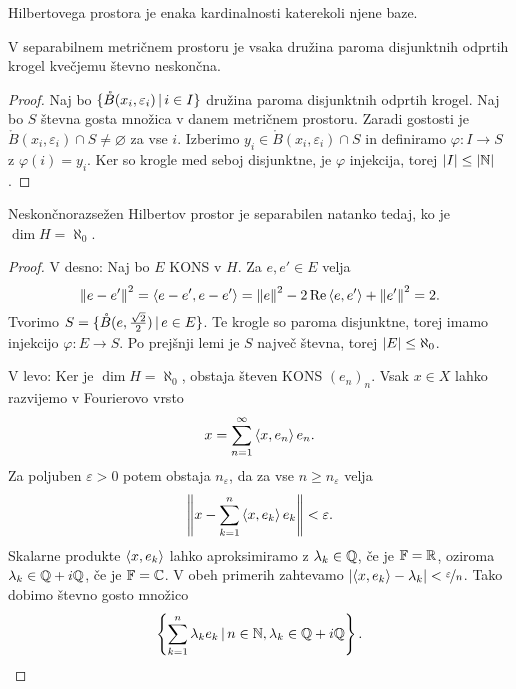 
\begin{definicija}
   Hilbertovega prostora je enaka kardinalnosti katerekoli
  njene baze.
\end{definicija}

\begin{lema}
  V separabilnem metričnem prostoru je vsaka družina paroma disjunktnih odprtih
  krogel kvečjemu števno neskončna.
\end{lema}

\begin{proof}
  Naj bo $\{ \mathring{B}(x_i, \varepsilon_i) \,|\, i \in I \}$ družina paroma
  disjunktnih odprtih krogel.
  Naj bo $S$ števna gosta množica v danem metričnem prostoru.
  Zaradi gostosti je $\mathring{B}(x_i, \varepsilon_i) \cap S \ne \varnothing$
  za vse $i$.
  Izberimo $y_i \in \mathring{B}(x_i, \varepsilon_i) \cap S$ in definiramo
  $\varphi: I \to S$ z $\varphi(i) = y_i$.
  Ker so krogle med seboj disjunktne, je $\varphi$ injekcija, torej $\left| I \right| \le
  \left| \mathbb{N} \right|$.
\end{proof}

\begin{trditev}
  Neskončnorazsežen Hilbertov prostor je separabilen natanko tedaj, ko je $\dim
  H = \aleph_0$.
\end{trditev}

\begin{proof}
  V desno:
  Naj bo $E$ KONS v $H$.
  Za $e, e' \in E$ velja
  \[
	\left\lVert e-e'\right\rVert^2 = \left< e-e', e-e' \right> = \left\lVert e\right\rVert^2 - 2 \operatorname{Re} \left< e, e' \right> +
	\left\lVert e'\right\rVert^2 = 2.
  \]
  Tvorimo $S = \{ \mathring{B}(e, \frac{\sqrt{2}}{2}) \,|\, e \in E\}$.
  Te krogle so paroma disjunktne, torej imamo injekcijo $\varphi: E \to S$.
  Po prejšnji lemi je $S$ največ števna, torej $\left| E \right| \le \aleph_0$.

  V levo:
  Ker je $\dim H = \aleph_0$, obstaja števen KONS $(e_n)_n$.
  Vsak $x \in X$ lahko razvijemo v Fourierovo vrsto
  \[
	x = \sum_{n =1}^\infty \left< x, e_n \right> e_n.
  \]
  Za poljuben $\varepsilon > 0$ potem obstaja $n_\varepsilon$, da za vse $n \ge
  n_\varepsilon$ velja
  \[
	\left\lVert x - \sum_{k=1}^n \left< x, e_k \right> e_k\right\rVert < \varepsilon.
  \]
  Skalarne produkte $\left< x, e_k \right>$ lahko aproksimiramo z $\lambda_k \in \mathbb{Q}$, če
  je $\mathbb{F} = \mathbb{R}$, oziroma $\lambda_k \in \mathbb{Q} + i \mathbb{Q}$, če je $\mathbb{F} = \mathbb{C}$.
  V obeh primerih zahtevamo $\left| \left< x, e_k \right> - \lambda_k \right| <
  \nicefrac{\varepsilon}{n}$.
  Tako dobimo števno gosto množico
  \[
	\left\{ \sum_{k=1}^n \lambda_k e_k \,|\, n \in \mathbb{N}, \lambda_k \in \mathbb{Q} + i \mathbb{Q}
	\right\}.
	\qedhere
  \]
\end{proof}

